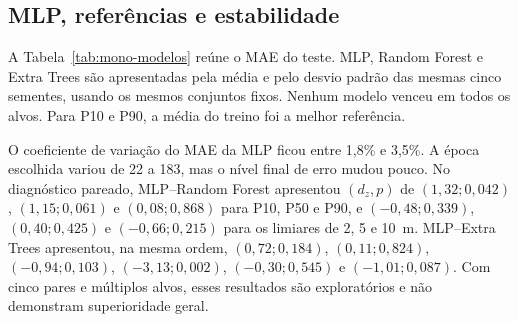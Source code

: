 \subsection{MLP, referências e estabilidade}

A Tabela~\ref{tab:mono-modelos} reúne o MAE do teste. MLP, Random Forest e Extra Trees são apresentadas pela média e pelo desvio padrão das mesmas cinco sementes, usando os mesmos conjuntos fixos. Nenhum modelo venceu em todos os alvos. Para P10 e P90, a média do treino foi a melhor referência.

\begin{table}[htb]
\centering
\caption{MAE no teste fixo e estabilidade da MLP.}
\label{tab:mono-modelos}
\end{table}

O coeficiente de variação do MAE da MLP ficou entre 1,8\% e 3,5\%. A época escolhida variou de 22 a 183, mas o nível final de erro mudou pouco. No diagnóstico pareado, MLP--Random Forest apresentou $(d_z,p)$ de $(1,32;0,042)$, $(1,15;0,061)$ e $(0,08;0,868)$ para P10, P50 e P90, e $(-0,48;0,339)$, $(0,40;0,425)$ e $(-0,66;0,215)$ para os limiares de 2, 5 e 10~m. MLP--Extra Trees apresentou, na mesma ordem, $(0,72;0,184)$, $(0,11;0,824)$, $(-0,94;0,103)$, $(-3,13;0,002)$, $(-0,30;0,545)$ e $(-1,01;0,087)$. Com cinco pares e múltiplos alvos, esses resultados são exploratórios e não demonstram superioridade geral.

